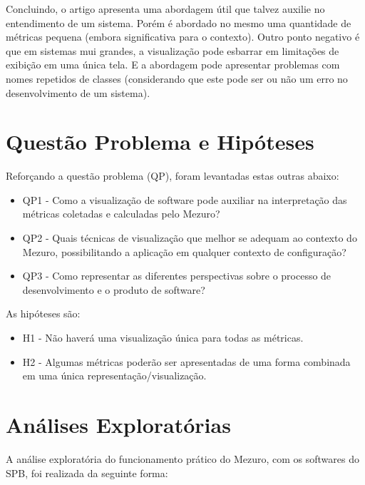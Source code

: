 Concluindo, o artigo apresenta uma abordagem útil que talvez auxilie no
entendimento de um sistema. Porém é abordado no mesmo uma quantidade de
métricas pequena (embora significativa para o contexto). Outro ponto negativo é
que em sistemas mui grandes, a visualização pode esbarrar em limitações de
exibição em uma única tela. E a abordagem pode apresentar problemas com nomes
repetidos de classes (considerando que este pode ser ou não um erro no
desenvolvimento de um sistema).

\section{Questão Problema e Hipóteses}

Reforçando a questão problema (QP), foram levantadas estas outras abaixo:

\begin{itemize}
  \item QP1 - Como a visualização de software pode auxiliar na
  interpretação das métricas coletadas e calculadas pelo Mezuro?
  \item QP2 - Quais técnicas de visualização que melhor se adequam ao
  contexto do Mezuro, possibilitando a aplicação em qualquer contexto de
  configuração?
  \item QP3 - Como representar as diferentes perspectivas sobre o processo
  de desenvolvimento e o produto de software?
\end{itemize}

As hipóteses são:

\begin{itemize}
  \item H1 - Não haverá uma visualização única para todas as métricas.
  \item H2 - Algumas métricas poderão ser apresentadas de uma forma combinada
  em uma única representação/visualização.
\end{itemize}


\section{Análises Exploratórias}

A análise exploratória do funcionamento prático do Mezuro, com os softwares do
SPB, foi realizada da seguinte forma:

